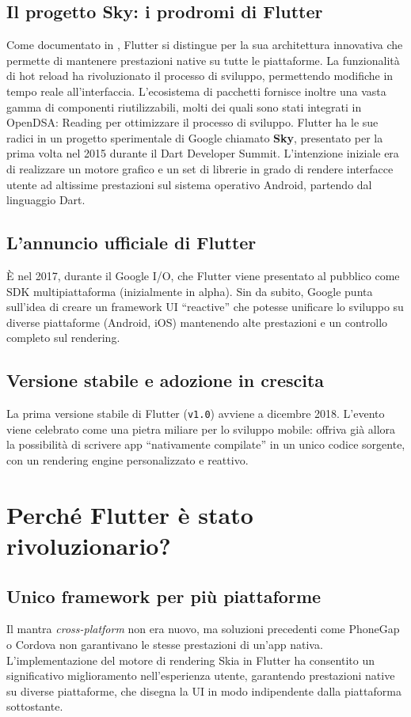 \documentclass[14pt]{extbook}
\begin{document}
\subsection{Il progetto Sky: i prodromi di Flutter}
Come documentato in \cite{flutter2018overview}, Flutter si distingue per la sua architettura innovativa che permette di mantenere prestazioni native su tutte le piattaforme. La funzionalità di hot reload \cite{flutter2023reload} ha rivoluzionato il processo di sviluppo, permettendo modifiche in tempo reale all'interfaccia. L'ecosistema di pacchetti \cite{pubdev2023packages} fornisce inoltre una vasta gamma di componenti riutilizzabili, molti dei quali sono stati integrati in OpenDSA: Reading per ottimizzare il processo di sviluppo.
Flutter ha le sue radici in un progetto sperimentale di Google chiamato \textbf{Sky}, presentato per la prima volta nel 2015 durante il Dart Developer Summit. L’intenzione iniziale era di realizzare un motore grafico e un set di librerie in grado di rendere interfacce utente ad altissime prestazioni sul sistema operativo Android, partendo dal linguaggio Dart.

\subsection{L’annuncio ufficiale di Flutter}
È nel 2017, durante il Google I/O, che Flutter viene presentato al pubblico come SDK multipiattaforma (inizialmente in alpha). Sin da subito, Google punta sull’idea di creare un framework UI “reactive” che potesse unificare lo sviluppo su diverse piattaforme (Android, iOS) mantenendo alte prestazioni e un controllo completo sul rendering.\\

\subsection{Versione stabile e adozione in crescita}
La prima versione stabile di Flutter (\texttt{v1.0}) avviene a dicembre 2018. L’evento viene celebrato come una pietra miliare per lo sviluppo mobile: offriva già allora la possibilità di scrivere app “nativamente compilate” in un unico codice sorgente, con un rendering engine personalizzato e reattivo.\\

\section{Perché Flutter è stato rivoluzionario?}
\subsection{Unico framework per più piattaforme}
Il mantra \emph{cross-platform} non era nuovo, ma soluzioni precedenti come PhoneGap o Cordova non garantivano le stesse prestazioni di un'app nativa. L'implementazione del motore di rendering Skia in Flutter ha consentito un significativo miglioramento nell'esperienza utente, garantendo prestazioni native su diverse piattaforme, che disegna la UI in modo indipendente dalla piattaforma sottostante\cite{google2015sky}.\\
\end{document}
